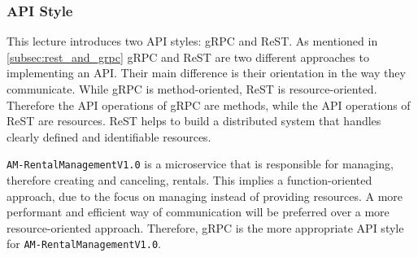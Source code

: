 \subsubsection*{API Style}
This lecture introduces two API styles: gRPC and ReST.
As mentioned in \autoref{subsec:rest_and_grpc} gRPC and ReST are two different approaches to implementing an API.
Their main difference is their orientation in the way they communicate.
While gRPC is method-oriented, ReST is resource-oriented.
Therefore the API operations of gRPC are methods, while the API operations of ReST are resources.
ReST helps to build a distributed system that handles clearly defined and identifiable resources.

\texttt{AM-RentalManagementV1.0} is a microservice that is responsible for managing, therefore creating and canceling, rentals.
This implies a function-oriented approach, due to the focus on managing instead of providing resources.
A more performant and efficient way of communication will be preferred over a more resource-oriented approach.
Therefore, gRPC is the more appropriate API style for \texttt{AM-RentalManagementV1.0}.
